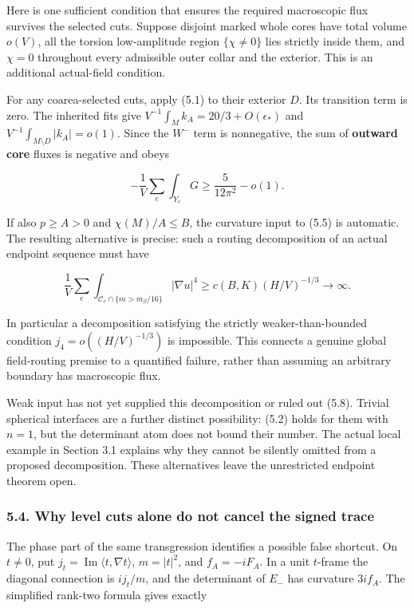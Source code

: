 \documentclass[
  10pt,
]{article}
\begin{document}
Here is one sufficient condition that ensures the required macroscopic
flux survives the selected cuts. Suppose disjoint marked whole cores
have total volume \(o(V)\), all the torsion low-amplitude region
\(\{\chi\ne0\}\) lies strictly inside them, and \(\chi=0\) throughout
every admissible outer collar and the exterior. This is an additional
actual-field condition.

For any coarea-selected cuts, apply (5.1) to their exterior \(D\). Its
transition term is zero. The inherited fits give
\(V^{-1}\int_M k_A=20/3+O(\epsilon_*)\) and
\(V^{-1}\int_{M\setminus D}|k_A|=o(1)\). Since the \(W^-\) term is
nonnegative, the sum of \textbf{outward core} fluxes is negative and
obeys

\[
 -\frac1V\sum_e\int_{Y_e}G
                         \ge\frac5{12\pi^2}-o(1).
 \tag{5.7}
\]

If also \(p\ge A>0\) and \(\chi(M)/A\le B\), the curvature input to
(5.5) is automatic. The resulting alternative is precise: such a routing
decomposition of an actual endpoint sequence must have

\[
 \frac1V\sum_e\int_{\mathcal C_e\cap\{m>m_\beta/16\}}|\nabla u|^4
                 \ge c(B,K)(H/V)^{-1/3}\longrightarrow\infty.
 \tag{5.8}
\]

In particular a decomposition satisfying the strictly
weaker-than-bounded condition \(j_4=o((H/V)^{-1/3})\) is impossible.
This connects a genuine global field-routing premise to a quantified
failure, rather than assuming an arbitrary boundary has macroscopic
flux.

Weak input has not yet supplied this decomposition or ruled out (5.8).
Trivial spherical interfaces are a further distinct possibility: (5.2)
holds for them with \(n=1\), but the determinant atom does not bound
their number. The actual local example in Section 3.1 explains why they
cannot be silently omitted from a proposed decomposition. These
alternatives leave the unrestricted endpoint theorem open.

\hypertarget{why-level-cuts-alone-do-not-cancel-the-signed-trace}{%
\subsubsection{5.4. Why level cuts alone do not cancel the signed
trace}\label{why-level-cuts-alone-do-not-cancel-the-signed-trace}}

The phase part of the same transgression identifies a possible false
shortcut. On \(t\ne0\), put
\(j_t=\operatorname{Im}\langle t,\nabla t\rangle\), \(m=|t|^2\), and
\(f_A=-iF_A\). In a unit \(t\)-frame the diagonal connection is
\(i j_t/m\), and the determinant of \(E_-\) has curvature \(3i f_A\).
The simplified rank-two formula gives exactly
\end{document}
